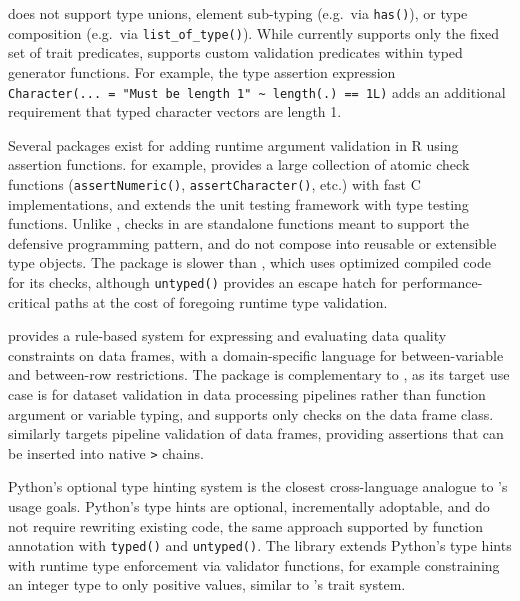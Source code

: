  does not support type unions, element sub-typing (e.g.~via \texttt{has()}), or type composition (e.g.~via \texttt{list\_of\_type()}). While  currently supports only the fixed set of trait predicates,  supports custom validation predicates within typed generator functions. For example, the type assertion expression \texttt{Character(...\ =\ "Must\ be\ length\ 1"\ \textasciitilde{}\ length(.)\ ==\ 1L)} adds an additional requirement that typed character vectors are length 1.

Several packages exist for adding runtime argument validation in R using assertion functions.  for example, provides a large collection of atomic check functions (\texttt{assertNumeric()}, \texttt{assertCharacter()}, etc.) with fast C implementations, and extends the  \citep{testthat} unit testing framework with type testing functions. Unlike , checks in  are standalone functions meant to support the defensive programming pattern, and do not compose into reusable or extensible type objects. The  package is slower than , which uses optimized compiled code for its checks, although \texttt{untyped()} provides an escape hatch for performance-critical paths at the cost of foregoing runtime type validation.

 \citep{validate} provides a rule-based system for expressing and evaluating data quality constraints on data frames, with a domain-specific language for between-variable and between-row restrictions. The package is complementary to , as its target use case is for dataset validation in data processing pipelines rather than function argument or variable typing, and supports only checks on the data frame class.  \citep{assertr} similarly targets pipeline validation of data frames, providing assertions that can be inserted into native \texttt{\textbar{}\textgreater{}} chains.

Python's optional type hinting system \citep{pep484} is the closest cross-language analogue to 's usage goals. Python's type hints are optional, incrementally adoptable, and do not require rewriting existing code, the same approach supported by function annotation with \texttt{typed()} and \texttt{untyped()}. The  \citep{pydantic} library extends Python's type hints with runtime type enforcement via validator functions, for example constraining an integer type to only positive values, similar to 's trait system.

